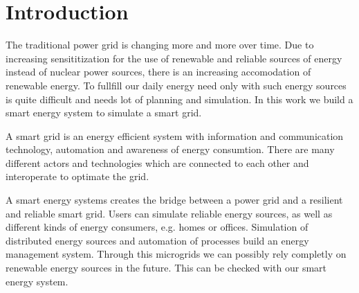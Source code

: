 \section{Introduction}

The traditional power grid is changing more and more over time.
Due to increasing sensititization for the use of renewable and reliable sources of energy instead of nuclear power sources, there is an increasing accomodation of renewable energy.
To fullfill our daily energy need only with such energy sources is quite difficult and needs lot of planning and simulation.
In this work we build a smart energy system to simulate a smart grid.

A smart grid is an energy efficient system with information and communication technology, automation and awareness of energy consumtion.
There are many different actors and technologies which are connected to each other and interoperate to optimate the grid.

A smart energy systems creates the bridge between a power grid and a resilient and reliable smart grid.
Users can simulate reliable energy sources, as well as different kinds of energy consumers, e.g. homes or offices.
Simulation of distributed energy sources and automation of processes build an energy management system.
Through this microgrids we can possibly rely completly on renewable energy sources in the future.
This can be checked with our smart energy system.

